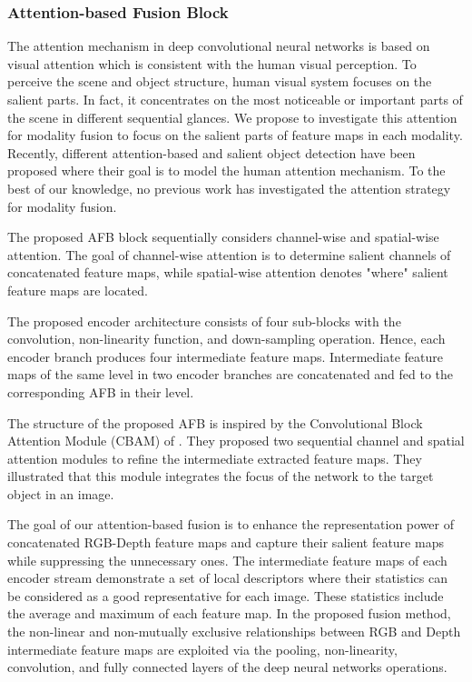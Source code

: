 \documentclass[journal,transmag]{IEEEtran}
\begin{document}
\subsubsection{Attention-based Fusion Block}
The attention mechanism in deep convolutional neural networks is based on visual attention which is consistent with the human visual perception. To perceive the scene and object structure,  human visual system focuses on the salient parts. In fact, it concentrates on the most noticeable or important parts of the scene in different sequential glances. We propose to investigate this attention for modality fusion to focus on the salient parts of feature maps in each modality. Recently, different attention-based and salient object detection \cite{li2017gla, quan2017unsupervised, fu2017saliency} have been proposed where their goal is to model the human attention mechanism. To the best of our knowledge, no previous work has investigated the attention strategy for modality fusion.

 The proposed AFB block sequentially considers channel-wise and spatial-wise attention. The goal of  channel-wise attention is to determine salient channels of concatenated feature maps, while spatial-wise attention denotes "where" salient feature maps are located. 

The proposed encoder architecture consists of four sub-blocks with the convolution, non-linearity function, and down-sampling operation. Hence, each encoder branch produces four intermediate feature maps. Intermediate feature maps of the same level in two encoder branches are concatenated and fed to the corresponding AFB in their level. 

The structure of the proposed AFB is inspired by the Convolutional Block Attention Module (CBAM) of \cite{woo2018cbam}. They proposed two sequential channel and spatial attention modules to refine the intermediate extracted feature maps. They illustrated that this module integrates the focus of the network to the target object in an image.

The goal of our attention-based fusion is to enhance the representation power of concatenated RGB-Depth feature maps and capture their salient feature maps while suppressing the unnecessary ones. The intermediate feature maps of each encoder stream demonstrate a set of local descriptors where their statistics can be considered as a good representative for each image. These statistics include the average and maximum  of each feature map. In the proposed fusion method, the non-linear and non-mutually exclusive relationships between RGB and Depth intermediate feature maps are exploited via the pooling, non-linearity, convolution, and fully connected layers of the deep neural networks operations. 
\end{document}
